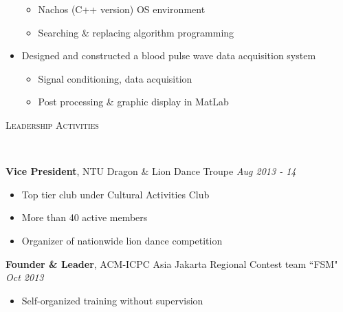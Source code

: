 \documentclass[a4paper, 12pt]{article}
\newenvironment{changemargin}[2]{%
  \begin{list}{}{%
      \setlength{\topsep}{0pt}%
      \setlength{\leftmargin}{#1}%
      \setlength{\rightmargin}{#2}%
      \setlength{\listparindent}{\parindent}%
      \setlength{\itemindent}{\parindent}%
      \setlength{\parsep}{\parskip}%
    }%
  \item[]}{\end{list}
}
\newcommand{\lineover}{
  \begin{changemargin}{-0.05in}{-0.05in}
    \vspace*{-8pt}
    \hrulefill \\
    \vspace*{-2pt}
  \end{changemargin}
}
\newcommand{\header}[1]{
  \begin{changemargin}{-0.5in}{-0.5in}
    \scshape{#1}\\
    \lineover
  \end{changemargin}
}
\newenvironment{body}
{
\vspace*{-16pt}
\begin{changemargin}{-0.25in}{-0.5in}
}	
{
\end{changemargin}
}
\begin{document}
\begin{body}
\begin{itemize}
    \begin{itemize} \itemsep -0pt \small
        \item Nachos (C++ version) OS environment
        \item Searching \& replacing algorithm programming
    \end{itemize}
  \item Designed and constructed a blood pulse wave data acquisition system
    \begin{itemize} \itemsep -0pt \small
        \item Signal conditioning, data acquisition
        \item Post processing \& graphic display in MatLab
    \end{itemize}
  \end{itemize}
\end{body}


\smallskip
\medskip
\header{Leadership Activities}
\begin{body}
  \vspace{14pt}
  \textbf{Vice President}, NTU Dragon \& Lion Dance Troupe \hfill {} \emph{Aug 2013 - 14}\\
  \begin{itemize} \itemsep -0pt \small
        \item Top tier club under Cultural Activities Club
        \item More than 40 active members
        \item Organizer of nationwide lion dance competition
  \end{itemize}
  \smallskip
  \textbf{Founder \& Leader}, ACM-ICPC Asia Jakarta Regional Contest team ``FSM" \hfill {} \emph{Oct 2013}\\
  \begin{itemize} \itemsep -0pt \small
        \item Self-organized training without supervision
  \end{itemize}
\end{body}

%
%
\end{document}
